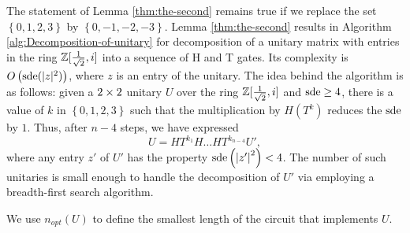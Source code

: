 \documentclass[english,journal]{extarticle}
\theoremstyle{plain}
\theoremstyle{plain}
\theoremstyle{plain}
\theoremstyle{definition}
\theoremstyle{plain}
\theoremstyle{plain}
\begin{document}
The statement of Lemma \ref{thm:the-second} remains true if we replace the set
$\left\{ 0,1,2,3\right\} $ by $\left\{ 0,-1,-2,-3\right\}$.  Lemma \ref{thm:the-second}
results in Algorithm \ref{alg:Decomposition-of-unitary}
for decomposition of a unitary matrix with entries in the ring $\mathbb{Z}[\frac{1}{\sqrt{2}},i]$ into
a sequence of H and T gates.  Its complexity is
$O\left(\mathrm{sde}(|z|^{2})\right)$,
where $z$ is an entry of the unitary. The idea behind the algorithm
is as follows: given a $2\times 2$ unitary $U$ over the ring $\mathbb{Z}[\frac{1}{\sqrt{2}},i]$ and $\mathrm{sde}\ge 4$,
there is a value of $k$ in $\left\{ 0,1,2,3\right\} $ such that the
multiplication by $H\left(T^{k}\right)$ reduces the $\mathrm{sde}$ by
$1$. Thus, after $n-4$ steps, we have expressed 
\[
U=HT^{k_{1}}H\ldots HT^{k_{n-4}}U',
\]
where any entry $z'$ of $U'$ has the property $\mathrm{sde}\left(\left|z'\right|^{2}\right)<4$.
The number of such unitaries is small enough to handle the decomposition
of $U'$ via employing a breadth-first search algorithm.

We use $n_{opt}(U)$ to define the smallest length of the circuit that implements $U$. 
\end{document}
